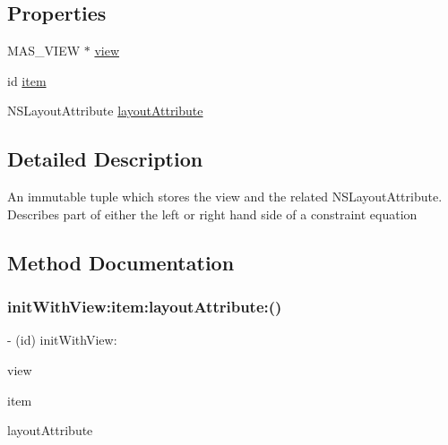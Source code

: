 \subsection*{Properties}
\begin{DoxyCompactItemize}
\item 
M\+A\+S\+\_\+\+V\+I\+EW $\ast$ \mbox{\hyperlink{interface_m_a_s_view_attribute_abfa1d9843dbff2385cf25170af57a876}{view}}
\item 
id \mbox{\hyperlink{interface_m_a_s_view_attribute_ad4b45fd8073e0715bd1e7983e28a7be0}{item}}
\item 
N\+S\+Layout\+Attribute \mbox{\hyperlink{interface_m_a_s_view_attribute_a7c16d2d97b7bc8c8abf6b35b659d2bef}{layout\+Attribute}}
\end{DoxyCompactItemize}


\subsection{Detailed Description}
An immutable tuple which stores the view and the related N\+S\+Layout\+Attribute. Describes part of either the left or right hand side of a constraint equation 

\subsection{Method Documentation}
\mbox{\label{interface_m_a_s_view_attribute_a14cf8e6b32be1710115a9248aceb3b85}} 
\subsubsection{\texorpdfstring{init\+With\+View\+:item\+:layout\+Attribute\+:()}{initWithView:item:layoutAttribute:()}}
{\footnotesize\ttfamily -\/ (id) init\+With\+View\+: \begin{DoxyParamCaption}\item[{(M\+A\+S\+\_\+\+V\+I\+EW $\ast$)}]{view }\item[{item:(id)}]{item }\item[{layoutAttribute:(N\+S\+Layout\+Attribute)}]{layout\+Attribute }\end{DoxyParamCaption}}


